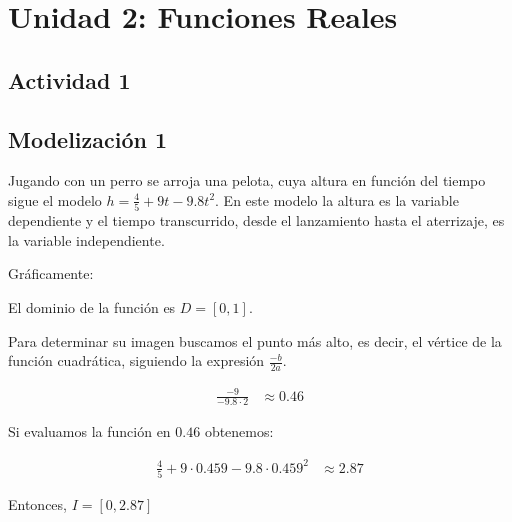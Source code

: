 \section*{Unidad 2: Funciones Reales}

\subsection*{Actividad 1}
\subsection*{Modelización 1}

Jugando con un perro se arroja una pelota, cuya altura en función del tiempo sigue el modelo $h = \frac{4}{5} + 9t - 9.8t^2$. En este modelo la altura es la variable dependiente y el tiempo transcurrido, desde el lanzamiento hasta el aterrizaje, es la variable independiente. 

Gráficamente:

\begin{center}
\end{center}

El dominio de la función es $D = [0,1]$.

Para determinar su imagen buscamos el punto más alto, es decir, el vértice de la función cuadrática, siguiendo la expresión $\frac{-b}{2a}$. 

\begin{align*}
	\frac{-9}{-9.8 \cdot 2} &\approx 0.46
\end{align*}

Si evaluamos la función en $0.46$ obtenemos:

\begin{align*}
	\frac{4}{5} + 9 \cdot 0.459 - 9.8 \cdot 0.459^2 &\approx 2.87
\end{align*}

Entonces, $I = [0, 2.87]$
